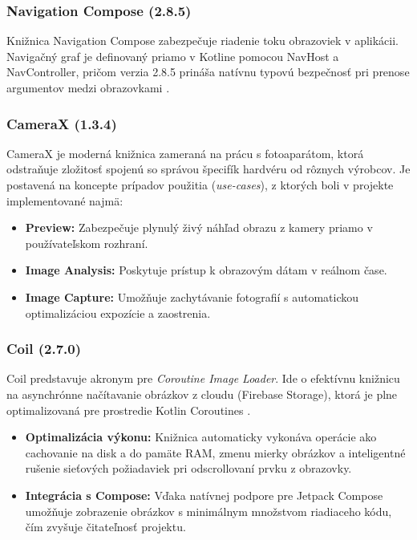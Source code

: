 \subsubsection{Navigation Compose (2.8.5)}
Knižnica Navigation Compose zabezpečuje riadenie toku obrazoviek v aplikácii.
Navigačný graf je definovaný priamo v Kotline pomocou NavHost a                                                                                                              
NavController, pričom verzia 2.8.5 prináša natívnu typovú bezpečnosť                                                                                                         
pri prenose argumentov medzi obrazovkami \cite{google_nav_compose}.   

\subsubsection{CameraX (1.3.4)}
CameraX je moderná knižnica zameraná na prácu s fotoaparátom, ktorá odstraňuje zložitosť spojenú so správou špecifík
hardvéru od rôznych výrobcov. Je postavená na koncepte prípadov použitia (\textit{use-cases}), z ktorých boli v projekte implementované najmä\cite{google_camerax}:
\begin{itemize}[noitemsep, topsep=0pt]
    \item \textbf{Preview:} Zabezpečuje plynulý živý náhľad obrazu z kamery priamo v používateľskom rozhraní.
    \item \textbf{Image Analysis:} Poskytuje prístup k obrazovým dátam v reálnom čase.
    \item \textbf{Image Capture:} Umožňuje zachytávanie fotografií s automatickou optimalizáciou expozície a zaostrenia.
\end{itemize}

\subsubsection{Coil (2.7.0)}
Coil predstavuje akronym pre \textit{Coroutine Image Loader}. Ide o efektívnu knižnicu na asynchrónne načítavanie obrázkov 
z cloudu (Firebase Storage), ktorá je plne optimalizovaná pre prostredie Kotlin Coroutines \cite{coil_library}.
\begin{itemize}[noitemsep, topsep=0pt]
    \item \textbf{Optimalizácia výkonu:} Knižnica automaticky vykonáva operácie ako cachovanie na disk a do pamäte RAM, zmenu mierky obrázkov a inteligentné rušenie sieťových požiadaviek pri odscrollovaní prvku z obrazovky.
    \item \textbf{Integrácia s Compose:} Vďaka natívnej podpore pre Jetpack Compose umožňuje zobrazenie obrázkov s minimálnym množstvom riadiaceho kódu, čím zvyšuje čitateľnosť projektu.
\end{itemize}

